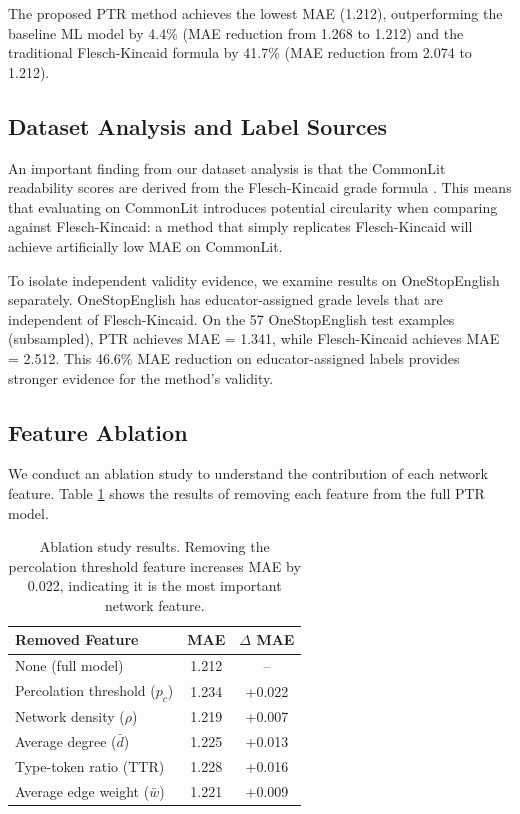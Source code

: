 \documentclass[11pt,letterpaper]{article}
\begin{document}
The proposed PTR method achieves the lowest MAE (1.212), outperforming the baseline ML model by 4.4\% (MAE reduction from 1.268 to 1.212) and the traditional Flesch-Kincaid formula by 41.7\% (MAE reduction from 2.074 to 1.212).

\subsection{Dataset Analysis and Label Sources}

An important finding from our dataset analysis is that the CommonLit readability scores are derived from the Flesch-Kincaid grade formula \cite{Crossley2022}. This means that evaluating on CommonLit introduces potential circularity when comparing against Flesch-Kincaid: a method that simply replicates Flesch-Kincaid will achieve artificially low MAE on CommonLit.

To isolate independent validity evidence, we examine results on OneStopEnglish separately. OneStopEnglish has educator-assigned grade levels that are independent of Flesch-Kincaid. On the 57 OneStopEnglish test examples (subsampled), PTR achieves MAE = 1.341, while Flesch-Kincaid achieves MAE = 2.512. This 46.6\% MAE reduction on educator-assigned labels provides stronger evidence for the method's validity.

\subsection{Feature Ablation}

We conduct an ablation study to understand the contribution of each network feature. Table \ref{tab:ablation} shows the results of removing each feature from the full PTR model.

\begin{table}[!htbp]
\centering
\caption{Ablation study results. Removing the percolation threshold feature increases MAE by 0.022, indicating it is the most important network feature.}
\label{tab:ablation}
\begin{tabular}{lcc}
\toprule
Removed Feature & MAE & $\Delta$ MAE \\
\midrule
None (full model) & 1.212 & -- \\
Percolation threshold ($p_c$) & 1.234 & +0.022 \\
Network density ($\rho$) & 1.219 & +0.007 \\
Average degree ($\bar{d}$) & 1.225 & +0.013 \\
Type-token ratio (TTR) & 1.228 & +0.016 \\
Average edge weight ($\bar{w}$) & 1.221 & +0.009 \\
\bottomrule
\end{tabular}
\end{table}
\end{document}

